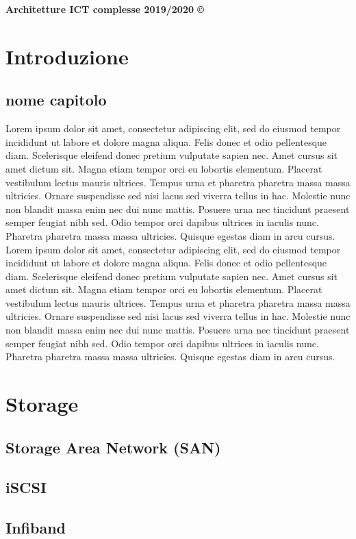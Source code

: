 \documentclass[8pt,a4paper]{article}
\begin{document}
\thispagestyle{empty}
\noindent
  \textbf{Architetture ICT complesse 2019/2020 ©}
\begin{multicols}{4}
   \section{Introduzione}
   \subsection{nome capitolo}
   Lorem ipsum dolor sit amet, consectetur adipiscing elit, sed do eiusmod tempor incididunt ut labore et dolore magna aliqua. Felis donec et odio pellentesque diam. Scelerisque eleifend donec pretium vulputate sapien nec. Amet cursus sit amet dictum sit. Magna etiam tempor orci eu lobortis elementum. Placerat vestibulum lectus mauris ultrices. Tempus urna et pharetra pharetra massa massa ultricies. Ornare suspendisse sed nisi lacus sed viverra tellus in hac. Molestie nunc non blandit massa enim nec dui nunc mattis. Posuere urna nec tincidunt praesent semper feugiat nibh sed. Odio tempor orci dapibus ultrices in iaculis nunc. Pharetra pharetra massa massa ultricies. Quisque egestas diam in arcu cursus.
   Lorem ipsum dolor sit amet, consectetur adipiscing elit, sed do eiusmod tempor incididunt ut labore et dolore magna aliqua. Felis donec et odio pellentesque diam. Scelerisque eleifend donec pretium vulputate sapien nec. Amet cursus sit amet dictum sit. Magna etiam tempor orci eu lobortis elementum. Placerat vestibulum lectus mauris ultrices. Tempus urna et pharetra pharetra massa massa ultricies. Ornare suspendisse sed nisi lacus sed viverra tellus in hac. Molestie nunc non blandit massa enim nec dui nunc mattis. Posuere urna nec tincidunt praesent semper feugiat nibh sed. Odio tempor orci dapibus ultrices in iaculis nunc. Pharetra pharetra massa massa ultricies. Quisque egestas diam in arcu cursus.
\section{Storage}
\subsection{Storage Area Network (SAN)}	
\subsection{iSCSI}	
\subsection{Infiband}	

\end{multicols}
\end{document}
